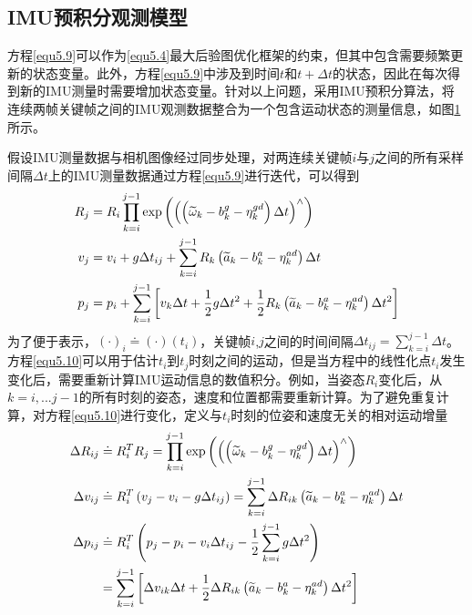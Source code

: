 \subsection{IMU预积分观测模型}
方程\ref{equ5.9}可以作为\ref{equ5.4}最大后验图优化框架的约束，但其中包含需要频繁更新的状态变量。此外，方程\ref{equ5.9}中涉及到时间$t$和$t+\Delta t$的状态，因此在每次得到新的IMU测量时需要增加状态变量。针对以上问题，采用IMU预积分算法，将连续两帧关键帧之间的IMU观测数据整合为一个包含运动状态的测量信息，如图\ref{fig5.2}所示。
\begin{figure}
\label{fig5.2}
\end{figure}

假设IMU测量数据与相机图像经过同步处理，对两连续关键帧$i$与$j$之间的所有采样间隔$\Delta t$上的IMU测量数据通过方程\ref{equ5.9}进行迭代，可以得到
\begin{equation}
\label{equ5.10}
\begin{aligned}
R_j &= R_i \prod\limits_{k=i}^{j-1}\exp \left( \left( \left( \widetilde{\omega}_k - b_k^g-\eta_k^{gd} \right) \Delta t \right)^{\wedge} \right) \\ 
v_j &= v_i+g\Delta t_{ij} +  \sum\limits_{k=i}^{j-1}R_k \left( \widetilde{a}_k - b_k^a -\eta_k^{ad} \right)\Delta t\\
p_j &= p_i + \sum\limits_{k=i}^{j-1} \left[ v_k \Delta t + {1 \over 2}g\Delta t^2 + {1 \over 2}R_k \left( \widetilde{a}_k - b_k^a -\eta_k^{ad} \right)\Delta t^2 \right]
\end{aligned}
\end{equation}
为了便于表示，$(\cdot)_i \doteq (\cdot)(t_i)$，关键帧$i$,$j$之间的时间间隔$\Delta t_{ij} = \sum_{k=i}^{j-1}\Delta t$。方程\ref{equ5.10}可以用于估计$t_i$到$t_j$时刻之间的运动，但是当方程中的线性化点$t_i$发生变化后，需要重新计算IMU运动信息的数值积分。例如，当姿态$R_i$变化后，从$k=i,...j-1$的所有时刻的姿态，速度和位置都需要重新计算。为了避免重复计算，对方程\ref{equ5.10}进行变化，定义与$t_i$时刻的位姿和速度无关的相对运动增量
\begin{equation}
\label{equ5.11}
\begin{aligned}
\Delta R_{ij} &\doteq R_i^T R_j = \prod\limits_{k=i}^{j-1}\exp \left( \left( \left( \widetilde{\omega}_k - b_k^g-\eta_k^{gd} \right) \Delta t  \right)^{\wedge} \right) \\ 
\Delta v_{ij} &\doteq R_i^T\left( v_j-v_i-g\Delta t_{ij}\right) =  \sum\limits_{k=i}^{j-1} \Delta R_{ik} \left( \widetilde{a}_k - b_k^a -\eta_k^{ad} \right)\Delta t\\ 
\Delta p_{ij} &\doteq R_i^T \left( p_j-p_i-v_i\Delta  t_{ij} - {1 \over 2} \sum\limits_{k=i}^{j-1} g\Delta t^2 \right) \\
&=  \sum\limits_{k=i}^{j-1} \left[ \Delta v_{ik} \Delta t + {1 \over 2}\Delta R_{ik} \left( \widetilde{a}_k - b_k^a -\eta_k^{ad} \right)\Delta t^2 \right]
\end{aligned}
\end{equation}
